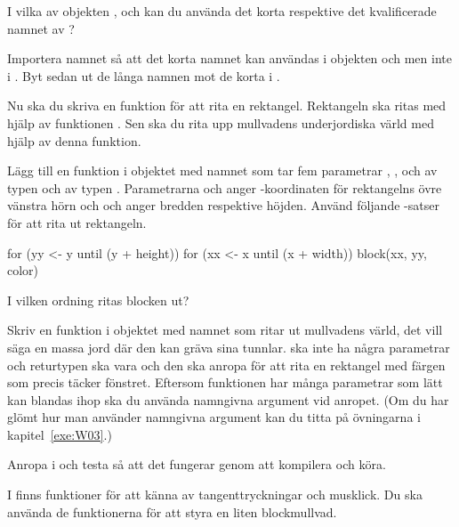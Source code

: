 \Subtask\Pen
I vilka av objekten ,  och  kan du använda det korta respektive det kvalificerade namnet av ?

\Subtask
Importera namnet  så att det korta namnet  kan användas i objekten  och  men inte i .
Byt sedan ut de långa namnen mot de korta i .

\Task
Nu ska du skriva en funktion för att rita en rektangel. Rektangeln ska ritas med hjälp av funktionen .
Sen ska du rita upp mullvadens underjordiska värld med hjälp av denna funktion.

\Subtask
Lägg till en funktion i objektet  med namnet  som tar fem parametrar , ,  och  av typen  och  av typen .
Parametrarna  och  anger -koordinaten för rektangelns övre vänstra hörn och  och  anger bredden respektive höjden.
Använd följande -satser för att rita ut rektangeln.
\begin{Code}
for (yy <- y until (y + height)) {
	for (xx <- x until (x + width)) {
		block(xx, yy, color)
	}
}
\end{Code}

\Subtask\Pen
I vilken ordning ritas blocken ut?


\Subtask
Skriv en funktion i objektet  med namnet  som ritar ut mullvadens värld, det vill säga en massa jord där den kan gräva sina tunnlar.
 ska inte ha några parametrar och returtypen ska vara  och den ska anropa  för att rita en rektangel med färgen  som precis täcker fönstret.
Eftersom funktionen har många parametrar som lätt kan blandas ihop ska du använda namngivna argument vid anropet.
(Om du har glömt hur man använder namngivna argument kan du titta på övningarna i kapitel~\ref{exe:W03}.)

\Subtask
Anropa  i  och testa så att det fungerar genom att kompilera och köra.

\Task
I  finns funktioner för att känna av tangenttryckningar och musklick.
Du ska använda de funktionerna för att styra en liten blockmullvad.

